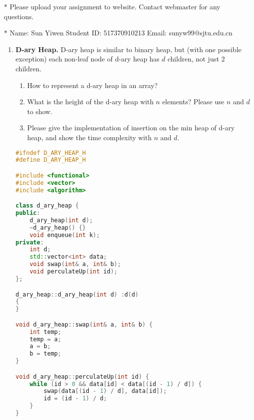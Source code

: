 \documentclass[12pt,a4paper]{article}
\theoremstyle{definition}
\begin{document}
\noindent

\noindent{}
\begin{center}
\footnotesize{\color{red}$*$ Please upload your assignment to website. Contact webmaster for any questions.}

\footnotesize{\color{blue}$*$ Name: Sun Yiwen  \quad Student ID: 517370910213 \quad Email: sunyw99@sjtu.edu.cn}
\end{center}


\begin{enumerate}

\item \textbf{D-ary Heap.} D-ary heap is similar to binary heap, but (with one possible exception) each non-leaf node of d-ary heap has $d$ children, not just $2$ children.

\begin{enumerate}
\item How to represent a d-ary heap in an array?
\item What is the height of the d-ary heap with $n$ elements? Please use $n$ and $d$ to show.
\item Please give the implementation of insertion on the min heap of d-ary heap, and show the time complexity with $n$ and $d$.
\end{enumerate}

\begin{lstlisting}[language=C++]
#ifndef D_ARY_HEAP_H
#define D_ARY_HEAP_H

#include <functional>
#include <vector>
#include <algorithm>

class d_ary_heap {
public:
	d_ary_heap(int d);
	~d_ary_heap() {}
	void enqueue(int k);
private:
	int d;
	std::vector<int> data;
	void swap(int& a, int& b);
	void perculateUp(int id);
};

d_ary_heap::d_ary_heap(int d) :d(d)
{
}

void d_ary_heap::swap(int& a, int& b) {
	int temp;
	temp = a;
	a = b;
	b = temp;
}

void d_ary_heap::perculateUp(int id) {
	while (id > 0 && data[id] < data[(id - 1) / d]) {
		swap(data[(id - 1) / d], data[id]);
		id = (id - 1) / d;
	}
}


\end{lstlisting}
\end{enumerate}
\end{document}
